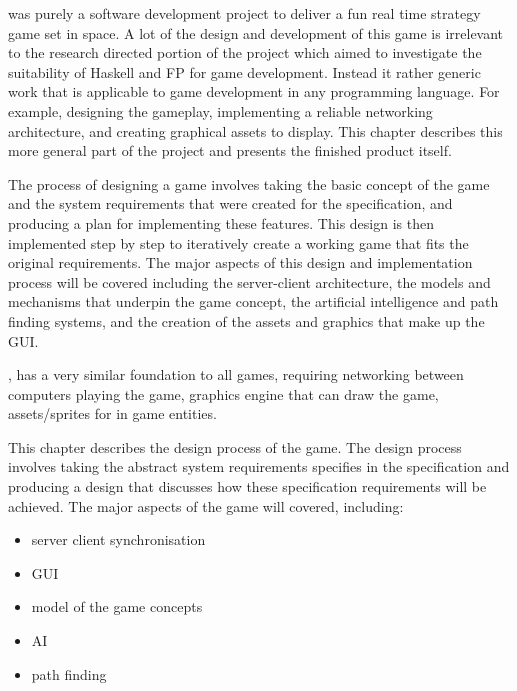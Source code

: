 
 was purely a software development project to deliver a fun real time strategy game set in space. A lot of the design and development of this game is irrelevant to the research directed portion of the project which aimed to investigate the suitability of Haskell and FP for game development. Instead it rather generic work that is applicable to game development in any programming language. For example, designing the gameplay, implementing a reliable networking architecture, and creating graphical assets to display. This chapter describes this more general part of the project and presents the finished product itself.

The process of designing a game involves taking the basic concept of the game and the system requirements that were created for the specification, and producing a plan for implementing these features. This design is then implemented step by step to iteratively create a working game that fits the original requirements. The major aspects of this design and implementation process will be covered including the server-client architecture, the models and mechanisms that underpin the game concept, the artificial intelligence and path finding systems, and the creation of the assets and graphics that make up the GUI.





, has a very similar foundation to all games, requiring networking between computers playing the game, graphics engine that can draw the game, assets/sprites for in game entities.


This chapter describes the design process of the game.
The design process involves taking the abstract system requirements specifies in the specification and producing a design that discusses how these specification requirements will be achieved.
The major aspects of the game will covered, including:
\begin{itemize}
\item server client synchronisation
\item GUI
\item model of the game concepts
\item AI
\item path finding
\end{itemize}

